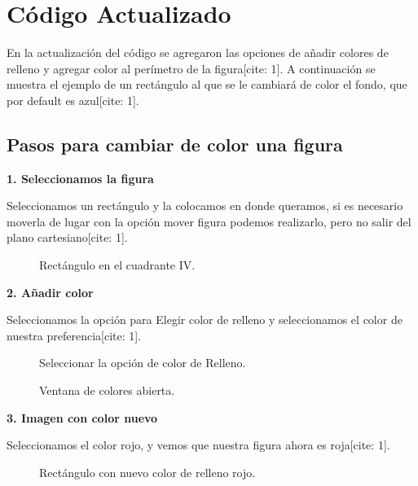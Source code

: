 \documentclass[12pt,letterpaper]{article}
\begin{document}
\section{Código Actualizado}
\label{sec:codigo_actualizado}

En la actualización del código se agregaron las opciones de añadir colores de relleno y agregar color al perímetro de la figura[cite: 1]. A continuación se muestra el ejemplo de un rectángulo al que se le cambiará de color el fondo, que por default es azul[cite: 1].

\subsection{Pasos para cambiar de color una figura}

\textbf{1. Seleccionamos la figura}

Seleccionamos un rectángulo y la colocamos en donde queramos, si es necesario moverla de lugar con la opción mover figura podemos realizarlo, pero no salir del plano cartesiano[cite: 1].

\begin{figure}[H]
    \centering
    \caption{Rectángulo en el cuadrante IV.}
    \label{fig:rectangulo_cuadrante}
\end{figure}

\textbf{2. Añadir color}

Seleccionamos la opción para Elegir color de relleno y seleccionamos el color de nuestra preferencia[cite: 1].

\begin{figure}[H]
    \centering
    \caption{Seleccionar la opción de color de Relleno.}
    \label{fig:color_relleno}
\end{figure}

\begin{figure}[H]
    \centering
    \caption{Ventana de colores abierta.}
    \label{fig:ventana_colores}
\end{figure}

\textbf{3. Imagen con color nuevo}

Seleccionamos el color rojo, y vemos que nuestra figura ahora es roja[cite: 1].

\begin{figure}[H]
    \centering
    \caption{Rectángulo con nuevo color de relleno rojo.}
    \label{fig:color_nuevo}
\end{figure}
\end{document}
